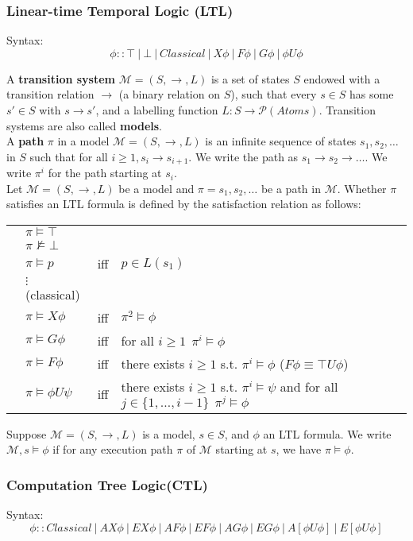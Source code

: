 \documentclass{article}
\begin{document}
\subsubsection{Linear-time Temporal Logic (LTL)}
Syntax: \[\phi::\top\ |\ \bot\ |\ Classical\ |\ X\phi\ |\ F\phi\ |\ G\phi\ |\ \phi U\phi\]

A \textbf{transition system} $\mathcal{M}=(S,\rightarrow,L)$ is a set of states $S$ endowed with a transition relation $\rightarrow$ (a binary relation on $S$), such that every $s\in S$ has some $s'\in S$ with $s\rightarrow s'$,
and a labelling function $L:S\rightarrow \mathcal{P}(Atoms)$. Transition systems are also called \textbf{models}.\\

A \textbf{path} $\pi$ in a model $\mathcal{M}=(S,\rightarrow,L)$ is an infinite sequence of states $s_1,s_2,\ldots$ in $S$ such that for all $i\geq 1, s_i\rightarrow s_{i+1}$. 
We write the path as $s_1\rightarrow s_2\rightarrow\ldots$. We write $\pi^i$ for the path starting at $s_i$.\\

Let $\mathcal{M}=(S,\rightarrow,L)$ be a model and $\pi = s_1,s_2,\ldots$ be a path in $\mathcal{M}$. Whether $\pi$ satisfies an LTL formula is defined by the satisfaction relation as follows:
\begin{center}
\begin{tabular}{r @{ } l c l}
 &$\pi\vDash\top$&&\\
 &$\pi\nvDash\bot$&&\\
 &$\pi\vDash p$ &iff& $p\in L(s_1)$\\
 &$\vdots$ (classical)&&\\
 &$\pi\vDash X\phi$ &iff& $\pi^2\vDash\phi$\\
 &$\pi\vDash G\phi$ &iff& for all $i\geq 1 \ \ \pi^i\vDash\phi$\\
 &$\pi\vDash F\phi$ &iff& there exists $i\geq 1$ s.t. $\pi^i\vDash\phi$ ($F\phi\equiv\top U\phi$)\\
 &$\pi\vDash \phi U\psi$ &iff& there exists $i\geq 1$ s.t. $\pi^i\vDash\psi$ and for all $j\in\{1,\ldots,i-1\} \ \ \pi^j\vDash\phi$
\end{tabular}
\end{center}
Suppose $\mathcal{M}=(S,\rightarrow,L)$ is a model, $s\in S$, and $\phi$ an LTL formula. We write $\mathcal{M},s\vDash\phi$ if for any execution path $\pi$ of $\mathcal{M}$ starting at $s$, we have $\pi\vDash\phi$.

\subsubsection{Computation Tree Logic(CTL)}
Syntax: \[\phi::Classical\ |\ AX\phi\ |\ EX\phi\ |\ AF\phi\ |\ EF\phi\ |\ AG\phi\ |\ EG\phi\ |\ A[\phi U\phi]\ |\ E[\phi U\phi]\]
\end{document}
